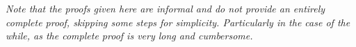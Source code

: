 \textit{Note that the proofs given here are informal and do not provide an entirely complete proof, skipping some steps for simplicity. Particularly in the case of the while, as the complete proof is very long and cumbersome.}

        
    
    
    


        

